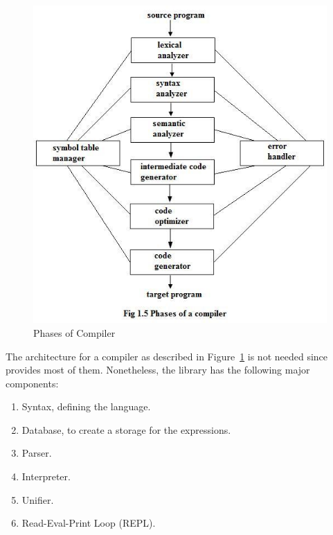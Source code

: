 \documentclass[thesis-solanki.tex]{subfiles}
\begin{document}
\begin{figure}[th]
\centering
\includegraphics[scale = 0.7]{Phases_of_compiler.jpg}
\caption{Phases of Compiler \cite{Aho:1986:CPT:6448}}
\label{fig:Phases of Compiler}
\end{figure}

The architecture for a compiler as described in Figure~\ref{fig:Phases of Compiler} is not needed since
 provides most of them.
Nonetheless, the library has the following major components:

\begin{enumerate}
\item Syntax, defining the language.

\item Database, to create a storage for the expressions.

\item Parser.

\item Interpreter.

\item Unifier.

\item Read-Eval-Print Loop (REPL).
\end{enumerate}
\end{document}
